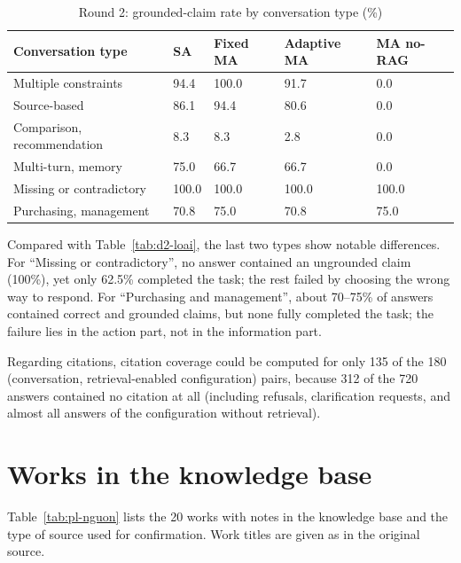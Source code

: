 \begin{table}[!htbp]
\caption{Round 2: grounded-claim rate by conversation type (\%)}
\label{tab:pl-can-cu}
\cobang
\begin{tabularx}{\linewidth}{YR{1.6cm}R{1.8cm}R{1.9cm}R{2.1cm}}
\toprule
\textbf{Conversation type} & \textbf{SA} & \textbf{Fixed MA} & \textbf{Adaptive MA} & \textbf{MA no-RAG}\\
\midrule
Multiple constraints & 94.4 & 100.0 & 91.7 & 0.0\\
Source-based & 86.1 & 94.4 & 80.6 & 0.0\\
Comparison, recommendation & 8.3 & 8.3 & 2.8 & 0.0\\
Multi-turn, memory & 75.0 & 66.7 & 66.7 & 0.0\\
Missing or contradictory & 100.0 & 100.0 & 100.0 & 100.0\\
Purchasing, management & 70.8 & 75.0 & 70.8 & 75.0\\
\bottomrule
\end{tabularx}
\end{table}

Compared with Table~\ref{tab:d2-loai}, the last two types show notable differences. For ``Missing or contradictory'', no answer contained an ungrounded claim (100\%), yet only 62.5\% completed the task; the rest failed by choosing the wrong way to respond. For ``Purchasing and management'', about 70--75\% of answers contained correct and grounded claims, but none fully completed the task; the failure lies in the action part, not in the information part.

Regarding citations, citation coverage could be computed for only 135 of the 180 (conversation, retrieval-enabled configuration) pairs, because 312 of the 720 answers contained no citation at all (including refusals, clarification requests, and almost all answers of the configuration without retrieval).

\chapter{Works in the knowledge base}
\label{app:kho-tri-thuc}

Table~\ref{tab:pl-nguon} lists the 20 works with notes in the knowledge base and the type of source used for confirmation. Work titles are given as in the original source.

